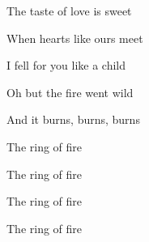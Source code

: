 \begin{song}
\bigskip

\Chorus

\bigskip

The taste  of love is sweet \par
When hearts  like ours meet \par
{}I fell for you  like a child \par
{}Oh  but the fire went wild \par

\bigskip

\Chorus {}

\bigskip

And it burns, burns, burns \par
{} The ring of fire \par
{} The ring of fire \par
{} The ring of fire \par
{} The ring of fire \par

\end{song}
